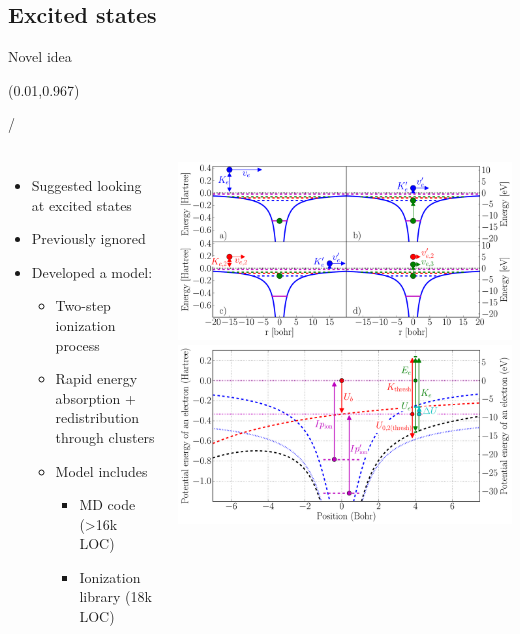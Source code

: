 \documentclass{beamer}
\makeatletter
\newcommand{\framenumber}{
\begin{textblock}{0}(0.01,0.967)
\begin{scriptsize}
{\color{gray}\insertframenumber/\inserttotalframenumber}
\end{scriptsize}
\end{textblock}
}
\makeatother
\begin{document}
\subsection{Excited states}
\begin{frame}{Novel idea}\framenumber
\begin{columns}
		\begin{itemize}
		\item Suggested looking at excited states
		\item Previously ignored
		\item Developed a model:
			\begin{itemize}
			\item Two-step ionization process
			\item Rapid energy absorption + redistribution through clusters
			\item Model includes
				\begin{itemize}
					\item MD code (>16k LOC)
					\item Ionization library (18k LOC)
				\end{itemize}
			\end{itemize}
		\end{itemize}
	\centering
		\hspace{-21pt}\includegraphics[width=1.1\textwidth]{../figures/ionization_aci} \\
		\hspace{-21pt}\includegraphics[width=1.1\textwidth]{figures/potential_landscape}

\end{columns}
\end{frame}
\end{document}
